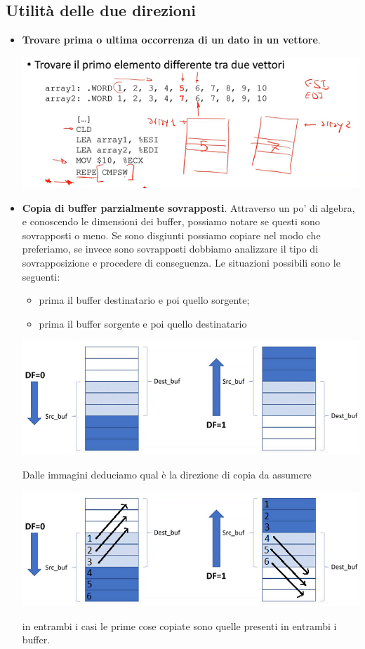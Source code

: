 \documentclass[11pt]{report}
\begin{document}
\subsection{Utilità delle due direzioni}
\begin{itemize}
\item \textbf{Trovare prima o ultima occorrenza di un dato in un vettore}.
\begin{center}
\includegraphics{img/65.PNG}
\end{center}
\item \textbf{Copia di buffer parzialmente sovrapposti}. Attraverso un po' di algebra, e conoscendo le dimensioni dei buffer, possiamo notare se questi sono sovrapposti o meno. Se sono disgiunti possiamo copiare nel modo che preferiamo, se invece sono sovrapposti dobbiamo analizzare il tipo di sovrapposizione e procedere di conseguenza. Le situazioni possibili sono le seguenti:
\begin{itemize}
\item prima il buffer destinatario e poi quello sorgente;
\item prima il buffer sorgente e poi quello destinatario
\end{itemize}
\begin{center}
\includegraphics{img/213.PNG}
\end{center}
Dalle immagini deduciamo qual è la direzione di copia da assumere
\begin{center}
\includegraphics{img/214.PNG}
\end{center}
in entrambi i casi le prime cose copiate sono quelle presenti in entrambi i buffer.
\end{itemize}
\clearpage
\end{document}
